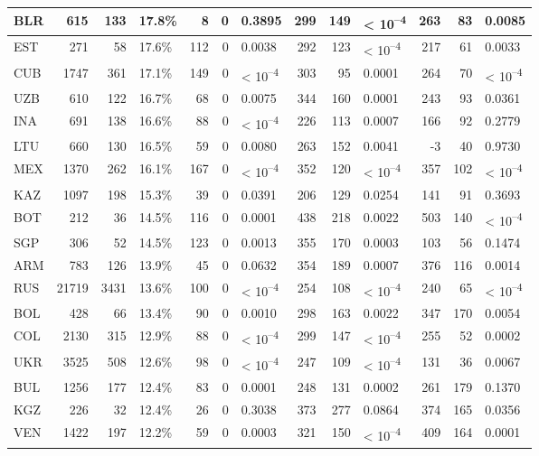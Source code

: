 \begin{tabular}{l|r|r|l|r|r|l|r|r|l|r|r|l}
\hline
BLR & 615 & 133 & 17.8\% & 8 & 0 & 0.3895 & 299 & 149 & < 10\textsuperscript{--4} & 263 & 83 & 0.0085\\
\hline
EST & 271 & 58 & 17.6\% & 112 & 0 & 0.0038 & 292 & 123 & < 10\textsuperscript{--4} & 217 & 61 & 0.0033\\
\hline
CUB & 1747 & 361 & 17.1\% & 149 & 0 & < 10\textsuperscript{--4} & 303 & 95 & 0.0001 & 264 & 70 & < 10\textsuperscript{--4}\\
\hline
UZB & 610 & 122 & 16.7\% & 68 & 0 & 0.0075 & 344 & 160 & 0.0001 & 243 & 93 & 0.0361\\
\hline
INA & 691 & 138 & 16.6\% & 88 & 0 & < 10\textsuperscript{--4} & 226 & 113 & 0.0007 & 166 & 92 & 0.2779\\
\hline
LTU & 660 & 130 & 16.5\% & 59 & 0 & 0.0080 & 263 & 152 & 0.0041 & -3 & 40 & 0.9730\\
\hline
MEX & 1370 & 262 & 16.1\% & 167 & 0 & < 10\textsuperscript{--4} & 352 & 120 & < 10\textsuperscript{--4} & 357 & 102 & < 10\textsuperscript{--4}\\
\hline
KAZ & 1097 & 198 & 15.3\% & 39 & 0 & 0.0391 & 206 & 129 & 0.0254 & 141 & 91 & 0.3693\\
\hline
BOT & 212 & 36 & 14.5\% & 116 & 0 & 0.0001 & 438 & 218 & 0.0022 & 503 & 140 & < 10\textsuperscript{--4}\\
\hline
SGP & 306 & 52 & 14.5\% & 123 & 0 & 0.0013 & 355 & 170 & 0.0003 & 103 & 56 & 0.1474\\
\hline
ARM & 783 & 126 & 13.9\% & 45 & 0 & 0.0632 & 354 & 189 & 0.0007 & 376 & 116 & 0.0014\\
\hline
RUS & 21719 & 3431 & 13.6\% & 100 & 0 & < 10\textsuperscript{--4} & 254 & 108 & < 10\textsuperscript{--4} & 240 & 65 & < 10\textsuperscript{--4}\\
\hline
BOL & 428 & 66 & 13.4\% & 90 & 0 & 0.0010 & 298 & 163 & 0.0022 & 347 & 170 & 0.0054\\
\hline
COL & 2130 & 315 & 12.9\% & 88 & 0 & < 10\textsuperscript{--4} & 299 & 147 & < 10\textsuperscript{--4} & 255 & 52 & 0.0002\\
\hline
UKR & 3525 & 508 & 12.6\% & 98 & 0 & < 10\textsuperscript{--4} & 247 & 109 & < 10\textsuperscript{--4} & 131 & 36 & 0.0067\\
\hline
BUL & 1256 & 177 & 12.4\% & 83 & 0 & 0.0001 & 248 & 131 & 0.0002 & 261 & 179 & 0.1370\\
\hline
KGZ & 226 & 32 & 12.4\% & 26 & 0 & 0.3038 & 373 & 277 & 0.0864 & 374 & 165 & 0.0356\\
\hline
VEN & 1422 & 197 & 12.2\% & 59 & 0 & 0.0003 & 321 & 150 & < 10\textsuperscript{--4} & 409 & 164 & 0.0001\\

\end{tabular}
